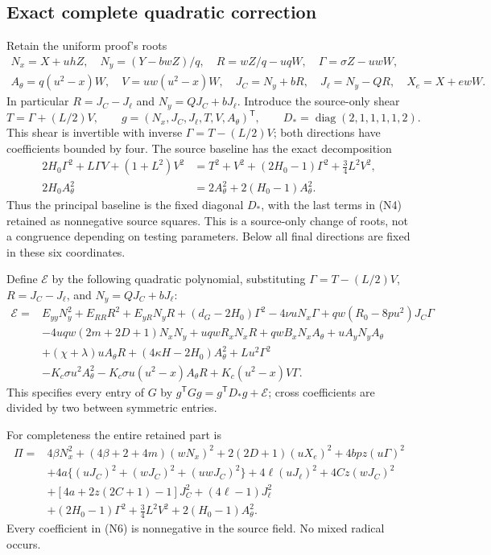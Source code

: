 \documentclass[11pt]{article}
\begin{document}
\subsection{Exact complete quadratic correction}

Retain the uniform proof's roots
\[
\begin{gathered}
 N_x=X+uhZ,\quad N_y=(Y-bwZ)/q,\quad
 R=wZ/q-uqW,\quad \Gamma=\sigma Z-uwW,\\
 A_\theta=q(u^2-x)W,\quad V=uw(u^2-x)W,\quad
 J_C=N_y+bR,\quad J_\ell=N_y-QR,\quad X_e=X+ewW.
\end{gathered}
\]
In particular $R=J_C-J_\ell$ and $N_y=QJ_C+bJ_\ell$.
Introduce the source-only shear
\[
 T=\Gamma+(L/2)V,\qquad
 g=(N_x,J_C,J_\ell,T,V,A_\theta)^{\mathsf T},\qquad
 D_* =\operatorname{diag}(2,1,1,1,1,2).
\]
This shear is invertible with inverse $\Gamma=T-(L/2)V$;
both directions have coefficients bounded by four.
The source baseline has the exact decomposition
\[
\begin{split}
 2H_0\Gamma^2+L\Gamma V+(1+L^2)V^2
 &=T^2+V^2+(2H_0-1)\Gamma^2+\tfrac34L^2V^2,\\
 2H_0A_\theta^2&=2A_\theta^2+2(H_0-1)A_\theta^2.
\end{split}                                                   \tag{N4}
\]
Thus the principal baseline is the fixed diagonal $D_*$, with the
last terms in (N4) retained as nonnegative source squares. This is
a source-only change of roots, not a congruence depending on testing
parameters. Below all final directions are fixed in these six coordinates.

Define $\mathcal E$ by the following quadratic polynomial, substituting
$\Gamma=T-(L/2)V$, $R=J_C-J_\ell$, and $N_y=QJ_C+bJ_\ell$:
\[
\begin{split}
 \mathcal E={}&E_{yy}N_y^2+E_{RR}R^2+E_{yR}N_yR
 +(d_G-2H_0)\Gamma^2-4\nu uN_x\Gamma
 +qw(R_0-8pu^2)J_C\Gamma\\
 &-4uqw(2m+2D+1)N_xN_y+uqwR_xN_xR
 +qwB_xN_xA_\theta+uA_yN_yA_\theta\\
 &+(\chi+\lambda)uA_\theta R
 +(4\kappa H-2H_0)A_\theta^2+Lu^2\Gamma^2\\
 &-K_c\sigma u^2 A_\theta^2
 -K_c\sigma u(u^2-x)A_\theta R
 +K_c(u^2-x)V\Gamma .
\end{split}                                                    \tag{N5}
\]
This specifies every entry of $G$ by
$g^{\mathsf T}Gg=g^{\mathsf T}D_*g+\mathcal E$; cross coefficients
are divided by two between symmetric entries.

For completeness the entire retained part is
\[
\begin{split}
 \Pi={}&4\beta N_x^2+(4\beta+2+4m)(wN_x)^2
 +2(2D+1)(uX_e)^2+4bpz(u\Gamma)^2\\
 &+4a\{(uJ_C)^2+(wJ_C)^2+(uwJ_C)^2\}
 +4\ell(uJ_\ell)^2+4Cz(wJ_C)^2\\
 &+[4a+2z(2C+1)-1]J_C^2+(4\ell-1)J_\ell^2\\
 &+(2H_0-1)\Gamma^2+\tfrac34L^2V^2
 +2(H_0-1)A_\theta^2.
\end{split}                                                    \tag{N6}
\]
Every coefficient in (N6) is nonnegative in the source field.
No mixed radical occurs.
\end{document}
